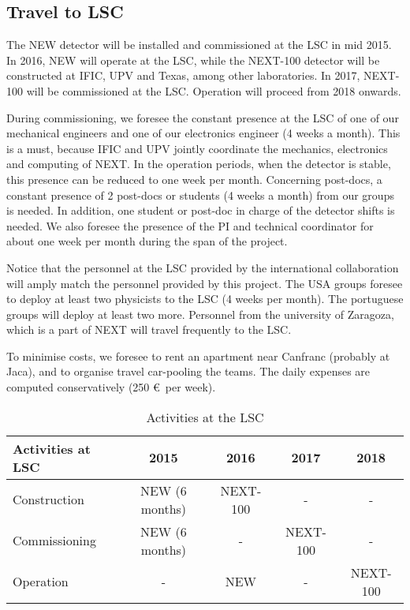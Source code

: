 \subsection{Travel to LSC}
The NEW detector will be installed and commissioned at the LSC in mid 2015. In 2016, NEW will operate at the LSC, while the NEXT-100 detector will be constructed at IFIC, UPV and Texas, among other laboratories. In 2017, NEXT-100 will be commissioned at the LSC. Operation will proceed from 2018 onwards.

During commissioning, we foresee the constant presence at the LSC of one of our mechanical engineers and one of our electronics engineer (4 weeks a month).  This is a must, because IFIC and UPV jointly coordinate the mechanics, electronics and computing of NEXT. In the operation periods, when the detector is stable, this presence can be reduced to one week per month. Concerning post-docs, a constant presence of 2 post-docs or students (4 weeks a month) from our groups is needed. In addition, one student or post-doc in charge of the detector shifts is needed. We also foresee the presence of the PI and technical coordinator for about one week per month during the span of the project. 

Notice that the personnel at the LSC provided by the international collaboration will amply match the personnel provided by this project. The USA groups foresee to deploy at least two physicists to the LSC (4 weeks per month). The portuguese groups will deploy at least two more. Personnel from the university of Zaragoza, which is a part of NEXT will travel frequently to the LSC. 

To minimise costs, we foresee to rent an apartment near Canfranc (probably at Jaca), and to organise travel car-pooling the teams. The daily expenses are computed conservatively (250 \euro\ per week). 

\begin{table}[h!]
\begin{center}
\begin{tabular}{|l|c|c|c|c|}
\hline
Activities at LSC &	2015 &	2016 &	2017 &	2018\\
 \hline	
Construction &	NEW (6 months) &	NEXT-100 & - & - \\ 		
Commissioning	&NEW (6 months) &	- & NEXT-100 & - \\	
Operation	&	- &  NEW & - & NEXT-100 \\ 	
\hline\hline	
\end{tabular}  
\caption{Activities at the LSC}
\label{tab.ActivitiesLSC}
\end{center}
\end{table}
 
